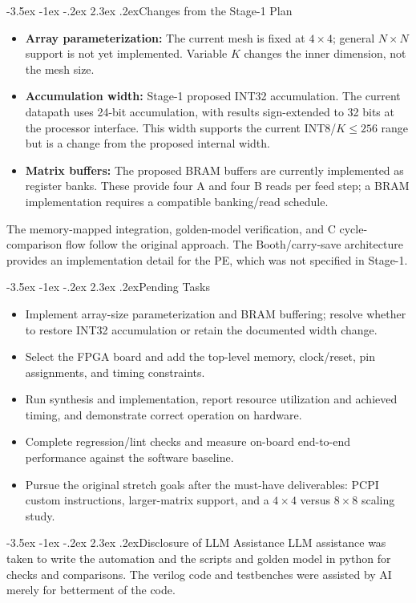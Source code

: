 \documentclass[12pt,a4paper]{article}
\makeatletter
\renewcommand\section{\@startsection{section}{1}{\z@}%
  {-3.5ex \@plus -1ex \@minus -.2ex}%
  {2.3ex \@plus .2ex}{\normalfont\large\bfseries}}
\makeatother
\begin{document}
\section{Changes from the Stage-1 Plan}
\begin{itemize}
    \item \textbf{Array parameterization:} The current mesh is fixed at
    $4\times4$; general $N\times N$ support is not yet implemented.
    Variable $K$ changes the inner dimension, not the mesh size.

    \item \textbf{Accumulation width:} Stage-1 proposed INT32 accumulation.
    The current datapath uses 24-bit accumulation, with results sign-extended
    to 32 bits at the processor interface. This width supports the current
    INT8/$K\leq256$ range but is a change from the proposed internal width.

    \item \textbf{Matrix buffers:} The proposed BRAM buffers are currently
    implemented as register banks. These provide four A and four B reads per
    feed step; a BRAM implementation requires a compatible banking/read schedule.
\end{itemize}
The memory-mapped integration, golden-model verification, and C cycle-comparison
flow follow the original approach. The Booth/carry-save architecture provides
an implementation detail for the PE, which was not specified in Stage-1.

\section{Pending Tasks}
\begin{itemize}
    \item Implement array-size parameterization and BRAM buffering; resolve
    whether to restore INT32 accumulation or retain the documented width change.
    \item Select the FPGA board and add the top-level memory, clock/reset,
    pin assignments, and timing constraints.
    \item Run synthesis and implementation, report resource utilization and
    achieved timing, and demonstrate correct operation on hardware.
    \item Complete regression/lint checks and measure on-board end-to-end
    performance against the software baseline.
    \item Pursue the original stretch goals after the must-have deliverables:
    PCPI custom instructions, larger-matrix support, and a $4\times4$ versus
    $8\times8$ scaling study.
\end{itemize}

\section{Disclosure of LLM Assistance}
LLM assistance was taken to write the automation and the scripts and golden model in python for checks and comparisons. The verilog code and testbenches were assisted by AI merely for betterment of the code.
\end{document}
